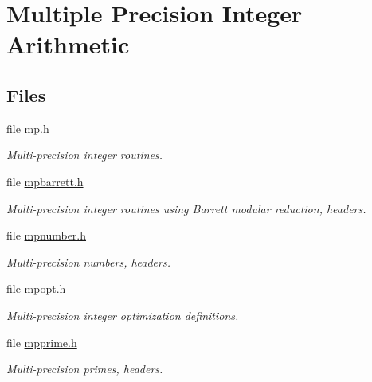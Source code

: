 \hypertarget{group__MP__m}{
\section{Multiple Precision Integer Arithmetic}
\label{group__MP__m}
}
\subsection*{Files}
\begin{CompactItemize}
\item 
file \hyperlink{mp_8h}{mp.h}
\begin{CompactList}\small\item\em Multi-precision integer routines. \item\end{CompactList}

\item 
file \hyperlink{mpbarrett_8h}{mpbarrett.h}
\begin{CompactList}\small\item\em Multi-precision integer routines using Barrett modular reduction, headers. \item\end{CompactList}

\item 
file \hyperlink{mpnumber_8h}{mpnumber.h}
\begin{CompactList}\small\item\em Multi-precision numbers, headers. \item\end{CompactList}

\item 
file \hyperlink{mpopt_8h}{mpopt.h}
\begin{CompactList}\small\item\em Multi-precision integer optimization definitions. \item\end{CompactList}

\item 
file \hyperlink{mpprime_8h}{mpprime.h}
\begin{CompactList}\small\item\em Multi-precision primes, headers. \item\end{CompactList}

\end{CompactItemize}
